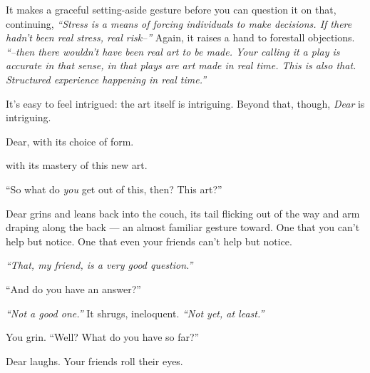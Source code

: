 It makes a graceful setting-aside gesture before you can question it on that, continuing, \emph{``Stress is a means of forcing individuals to make decisions. If there hadn't been real stress, real risk--''} Again, it raises a hand to forestall objections. \emph{``--then there wouldn't have been real art to be made. Your calling it a play is accurate in that sense, in that plays are art made in real time. This is also that. Structured experience happening in real time.''}

It's easy to feel intrigued: the art itself is intriguing. Beyond that, though, \emph{Dear} is intriguing.

\newpage
\null
\vfill

Dear, with its choice of form.

\phantom{Dear,} {\footnotesize with its mastery of this new art.}

\phantom{Dear, with}{\tiny its casual refusal to conform.}
\vfill

\newpage

\begin{comment}
\newpage

\null
\vfill

Dear, with its choice of form.

\null
\vfill

\newpage

\null
\vfill

Dear with its mastery of this new art.

\null
\vfill

\newpage

Dear with its casual refusal to conform.
\end{comment}

``So what do \emph{you} get out of this, then? This art?''

Dear grins and leans back into the couch, its tail flicking out of the way and arm draping along the back --- an almost familiar gesture toward. One that you can't help but notice. One that even your friends can't help but notice.

\emph{``That, my friend, is a very good question.''}

``And do you have an answer?''

\emph{``Not a good one.''} It shrugs, ineloquent. \emph{``Not yet, at least.''}

You grin. ``Well? What do you have so far?''

Dear laughs. Your friends roll their eyes.

